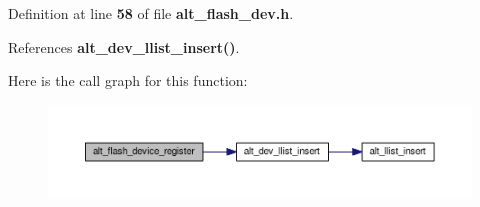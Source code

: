 Definition at line {\bf 58} of file {\bf alt\+\_\+flash\+\_\+dev.\+h}.



References {\bf alt\+\_\+dev\+\_\+llist\+\_\+insert()}.



Here is the call graph for this function\+:
\nopagebreak
\begin{figure}[H]
\begin{center}
\leavevmode
\includegraphics[width=350pt]{d7/d90/alt__flash__dev_8h_a334a719bd15ea7069db9dfdf0a56fe8b_cgraph}
\end{center}
\end{figure}


